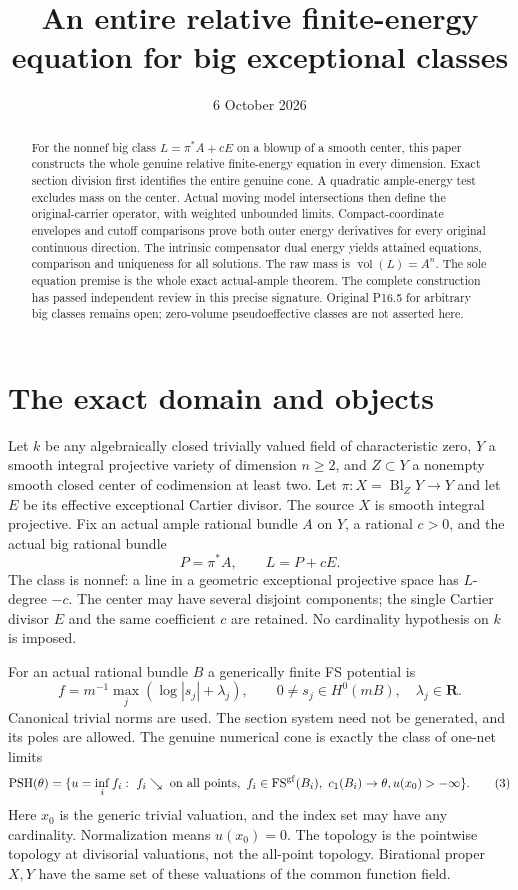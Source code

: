 \documentclass[11pt]{article}
\title{An entire relative finite-energy equation for big exceptional classes}
\author{}
\date{6 October 2026}
\newcommand{\PSH}{\operatorname{PSH}}
\newcommand{\FS}{\operatorname{FS}}
\begin{document}
\maketitle
\begin{abstract}
For the nonnef big class $L=\pi^*A+cE$ on a blowup of a smooth
center, this paper constructs the whole genuine
relative finite-energy equation in every dimension. Exact section
division first identifies the entire genuine cone. A quadratic
ample-energy test excludes mass on the center. Actual moving model
intersections then define the original-carrier operator, with
weighted unbounded limits. Compact-coordinate envelopes and cutoff
comparisons prove both outer energy derivatives for every original
continuous direction. The intrinsic compensator dual energy yields
attained equations, comparison and uniqueness for all solutions.
The raw mass is $\operatorname{vol}(L)=A^n$. The sole equation
premise is the whole exact actual-ample theorem. The complete construction has passed independent review in this
precise signature. Original P16.5 for arbitrary big classes remains open;
zero-volume pseudoeffective classes are not asserted here.
\end{abstract}

\section{The exact domain and objects}
Let $k$ be any algebraically closed trivially valued field of
characteristic zero, $Y$ a smooth integral projective variety of
dimension $n\geq2$, and $Z\subset Y$ a nonempty smooth closed
center of codimension at least two. Let
$\pi:X=\operatorname{Bl}_Z Y\to Y$ and let $E$ be its
effective exceptional Cartier divisor. The source $X$ is smooth
integral projective. Fix an actual ample rational bundle $A$ on $Y$,
a rational $c>0$, and the actual big rational bundle
\[
 P=\pi^*A,\qquad L=P+cE.                                  \tag{1}
\]
The class is nonnef: a line in a geometric exceptional projective
space has $L$-degree $-c$. The center may have several disjoint
components; the single Cartier divisor $E$ and the same coefficient
$c$ are retained. No cardinality hypothesis on $k$ is imposed.

For an actual rational bundle $B$ a generically finite FS potential is
\[
 f=m^{-1}\max_j(\log|s_j|+\lambda_j),\qquad
 0\ne s_j\in H^0(mB),\quad \lambda_j\in\mathbf R.          \tag{2}
\]
Canonical trivial norms are used. The section system need not be
generated, and its poles are allowed. The genuine numerical cone is
exactly the class of one-net limits
\[
 \PSH(\theta)=\{u=\inf_i f_i:\ f_i\searrow\text{ on all points},
  \ f_i\in\FS^{\rm gf}(B_i),\ c_1(B_i)\to\theta,
                         u(x_0)>-\infty\}.               \tag{3}
\]
Here $x_0$ is the generic trivial valuation, and the index set may
have any cardinality. Normalization means $u(x_0)=0$. The topology
is the pointwise topology at divisorial valuations, not the all-point
topology. Birational proper $X,Y$ have the same set of these
valuations of the common function field.
\end{document}
